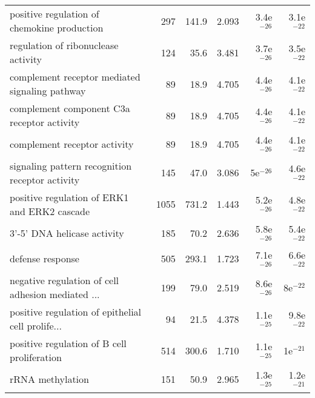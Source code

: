 \begin{longtable}{lrrrrr}
       positive regulation of chemokine production &                     297 &                   141.9 &      2.093 &         3.4e$^{-26}$ &         3.1e$^{-22}$ \\
               regulation of ribonuclease activity &                     124 &                    35.6 &      3.481 &         3.7e$^{-26}$ &         3.5e$^{-22}$ \\
    complement receptor mediated signaling pathway &                      89 &                    18.9 &      4.705 &         4.4e$^{-26}$ &         4.1e$^{-22}$ \\
        complement component C3a receptor activity &                      89 &                    18.9 &      4.705 &         4.4e$^{-26}$ &         4.1e$^{-22}$ \\
                      complement receptor activity &                      89 &                    18.9 &      4.705 &         4.4e$^{-26}$ &         4.1e$^{-22}$ \\
   signaling pattern recognition receptor activity &                     145 &                    47.0 &      3.086 &           5e$^{-26}$ &         4.6e$^{-22}$ \\
      positive regulation of ERK1 and ERK2 cascade &                    1055 &                   731.2 &      1.443 &         5.2e$^{-26}$ &         4.8e$^{-22}$ \\
                       3'-5' DNA helicase activity &                     185 &                    70.2 &      2.636 &         5.8e$^{-26}$ &         5.4e$^{-22}$ \\
                                  defense response &                     505 &                   293.1 &      1.723 &         7.1e$^{-26}$ &         6.6e$^{-22}$ \\
 negative regulation of cell adhesion mediated ... &                     199 &                    79.0 &      2.519 &         8.6e$^{-26}$ &           8e$^{-22}$ \\
 positive regulation of epithelial cell prolife... &                      94 &                    21.5 &      4.378 &         1.1e$^{-25}$ &         9.8e$^{-22}$ \\
       positive regulation of B cell proliferation &                     514 &                   300.6 &      1.710 &         1.1e$^{-25}$ &           1e$^{-21}$ \\
                                  rRNA methylation &                     151 &                    50.9 &      2.965 &         1.3e$^{-25}$ &         1.2e$^{-21}$ \\

\end{longtable}
